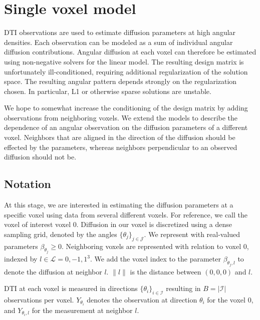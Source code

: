 \documentclass[11pt]{amsart}
\newcommand{\tj}{\theta_j}
\newcommand{\ti}{\theta_i}
\newcommand{\yti}{Y_{\theta_i}}
\newcommand{\ytil}{Y_{\theta_i,l}}
\begin{document}
\section{Single voxel model}
DTI observations are used to estimate diffusion parameters at high angular densities. 
Each observation can be modeled as a sum of individual angular diffusion contributions. 
Angular diffusion at each voxel can therefore be estimated using non-negative solvers for the linear model. 
The resulting design matrix is unfortunately ill-conditioned, requiring additional regularization of the solution space. 
The resulting angular pattern depends strongly on the regularization chosen. 
In particular, L1 or otherwise sparse solutions are unstable. 

We hope to somewhat increase the conditioning of the design matrix by adding observations 
from neighboring voxels. We extend the models to describe the dependence of 
an angular observation on the diffusion parameters of a different voxel. Neighbors 
that are aligned in the direction of the diffusion should be effected by the parameters,  
whereas neighbors perpendicular to an observed diffusion should not be. 

\subsection{Notation}

At this stage, we are interested in estimating the diffusion parameters at a 
specific voxel using data from several different voxels. 
For reference, we call the voxel of interest voxel 0. 
Diffusion in our voxel is discretized using a dense sampling grid, denoted by
the angles $\{\tj\}_{j \in \mathcal{J}}$. 
We represent with real-valued parameters $\beta_{\tj}\geq 0$.
Neighboring voxels are represented with relation to voxel $0$, indexed by $l \in \mathcal{L} = {0,-1,1}^3$. 
We add the voxel index to the parameter $\beta_{\tj, l}$ to denote the diffusion at neighbor $l$. 
$\|l\|$ is the distance between $(0,0,0)$ and $l$.

DTI at each voxel is measured in directions $\{\ti\}_{ i \in \mathcal{I}}$ resulting in  $B = |\mathcal{I}| $ observations per voxel.  
$\yti$ denotes the observation at direction $\ti$ for the voxel 0, and $\ytil$ for the 
measurement at neighbor $l$. 
\end{document}
